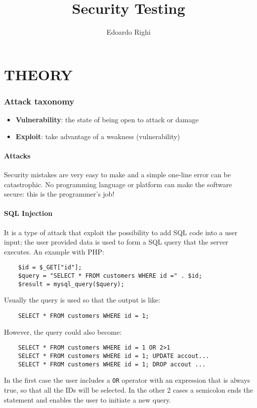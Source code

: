 \documentclass[a4paper, 10pt, titlepage]{article}
\begin{document}
\title{Security Testing}
\author{Edoardo Righi}
\maketitle
\thispagestyle{empty}
\tableofcontents
\newpage
\part{THEORY}
	
\newpage
\section{Attack taxonomy}
\begin{itemize}
\item \textbf{Vulnerability}: the state of being open to attack or damage
\item \textbf{Exploit}: take advantage of a weakness (vulnerability)
\end{itemize}
\subsection*{Attacks}
Security mistakes are very easy to make and a simple one-line error can be catastrophic. No programming language or platform can make the software secure: this is the programmer’s job!
	
\subsection{SQL Injection}
It is a type of attack that exploit the possibility to add SQL code into a user input; the user provided data is used to form a SQL query that the server executes. An example with PHP:
\begin{lstlisting}
	$id = $_GET["id"];
	$query = "SELECT * FROM customers WHERE id =" . $id;
	$result = mysql_query($query);
\end{lstlisting}
Usually the query is used so that the output is like:
\begin{lstlisting}
	SELECT * FROM customers WHERE id = 1;
\end{lstlisting}
However, the query could also become:
\begin{lstlisting}
	SELECT * FROM customers WHERE id = 1 OR 2>1
	SELECT * FROM customers WHERE id = 1; UPDATE accout...
	SELECT * FROM customers WHERE id = 1; DROP accout ...
\end{lstlisting}
In the first case the user includes a \lstinline|OR| operator with an expression that is always true, so that all the IDs will be selected. In the other 2 cases a semicolon ends the statement and enables the user to initiate a new query. 
\end{document}
